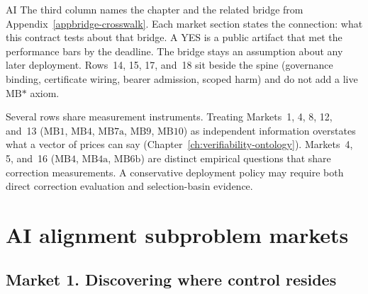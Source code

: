 \begin{authbar}{AI}
The third column names the chapter and the related bridge from Appendix~\ref{appbridge-crosswalk}.
Each market section states the connection: what this contract tests about that bridge.
A YES is a public artifact that met the performance bars by the deadline.
The bridge stays an assumption about any later deployment.
Rows~14, 15, 17, and~18 sit beside the spine (governance binding, certificate wiring, bearer admission, scoped harm) and do not add a live \(\text{MB*}\) axiom.

Several rows share measurement instruments.
Treating Markets~1, 4, 8, 12, and~13 (\(\text{MB1}\), \(\text{MB4}\), \(\text{MB7a}\), \(\text{MB9}\), \(\text{MB10}\)) as independent information overstates what a vector of prices can say (Chapter~\ref{ch:verifiability-ontology}).
Markets~4, 5, and~16 (\(\text{MB4}\), \(\text{MB4a}\), \(\text{MB6b}\)) are distinct empirical questions that share correction measurements.
A conservative deployment policy may require both direct correction evaluation and selection-basin evidence.

\end{authbar}
\authbarneedspace

\section{AI alignment subproblem markets}
\label{sec:appp-contracts}

\subsection{Market 1. Discovering where control resides}
\label{sec:appp-m1}

